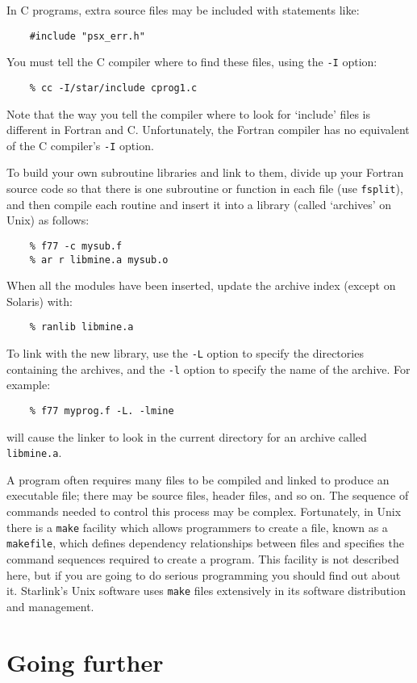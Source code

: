 In C programs, extra source files may be included with statements like:
\begin{verbatim}
    #include "psx_err.h"
\end{verbatim}
You must tell the C compiler where to find these files, using the {\tt -I}
option:
\begin{verbatim}
    % cc -I/star/include cprog1.c
\end{verbatim}
Note that the way you tell the compiler where to look for `include' files is
different in Fortran and C.
Unfortunately, the Fortran compiler has no equivalent of the C compiler's
{\tt -I} option.

To build your own subroutine libraries and link to them, divide up your
Fortran source code so that there is one subroutine or function in each file
(use {\tt fsplit}), and then compile each routine and insert it into a library
(called `archives' on Unix) as follows:
\begin{verbatim}
    % f77 -c mysub.f
    % ar r libmine.a mysub.o
\end{verbatim}
When all the modules have been inserted, update the archive index (except on
Solaris) with:
\begin{verbatim}
    % ranlib libmine.a
\end{verbatim}
To link with the new library, use the {\tt -L} option to specify the directories
containing the archives, and the {\tt -l} option to specify the name of the
archive.
For example:
\begin{verbatim}
    % f77 myprog.f -L. -lmine
\end{verbatim}
will cause the linker to look in the current directory for an archive called
{\tt libmine.a}.

A program often requires many files to be compiled and linked to produce an
executable file; there may be source files, header files, and so on.
The sequence of commands needed to control this process may be complex.
Fortunately, in Unix there is a {\tt make} facility which allows programmers to
create a file, known as a {\tt makefile}, which defines dependency
relationships between files and specifies the command sequences required to
create a program.
This facility is not described here, but if you are going to do serious
programming you should find out about it.
Starlink's Unix software uses {\tt make} files extensively in its software
distribution and management.

\section{Going further}

